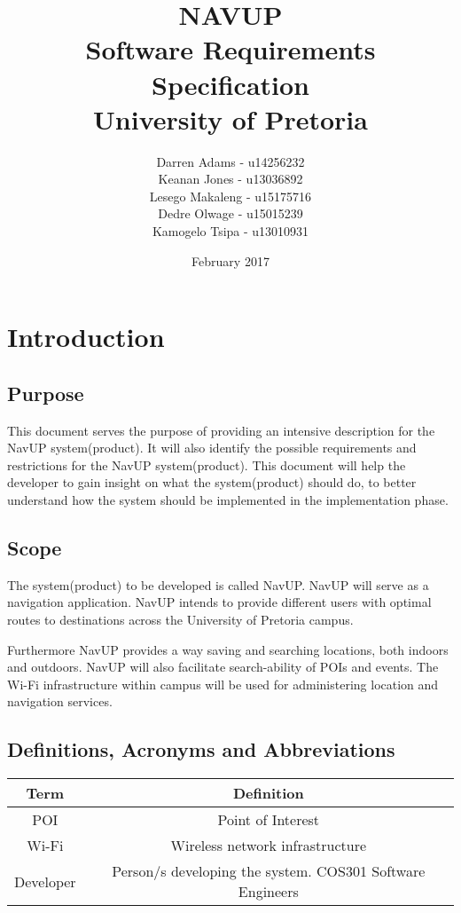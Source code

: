 \documentclass{article}
\title{NAVUP\\ Software Requirements Specification\\ University of Pretoria}
\author{Darren Adams\hspace{2 cm} - u14256232\\ Keanan Jones\hspace{2 cm} - u13036892\\ Lesego Makaleng\hspace{2 cm} - u15175716\\ Dedre Olwage\hspace{2 cm} - u15015239\\ Kamogelo Tsipa\hspace{2 cm} - u13010931 }
\date{February 2017}
\begin{document}
\maketitle
\pagebreak
\tableofcontents
\pagebreak
\section{Introduction}
    \subsection{Purpose}
		\begin{flushleft}
			This document serves the purpose of providing an intensive description for the NavUP system(product). It will also identify the possible requirements and restrictions for the NavUP system(product). This document will help the developer to gain insight on what the system(product) should do, to better understand how the system should be implemented in the implementation phase.
		\end{flushleft}
    \subsection{Scope}
		\begin{flushleft}
			The system(product) to be developed is called NavUP. NavUP will serve as a navigation application. NavUP intends to provide different users with optimal routes to destinations across the University of Pretoria campus.
			
			Furthermore NavUP provides a way saving and searching locations, both indoors and outdoors. NavUP will also facilitate search-ability of POIs and events. The Wi-Fi infrastructure within campus will be used for administering location and navigation services.
		\end{flushleft}
    \subsection{Definitions, Acronyms and Abbreviations}
        \begin{table}[h!]
            \centering
            \begin{tabular}{|c|c|}
            \hline
            Term & Definition \\
            \hline
            POI & Point of Interest \\
            \hline
            Wi-Fi & Wireless network infrastructure \\
            \hline
            Developer & Person/s developing the system. COS301 Software Engineers
            \\
            \hline
            \end{tabular}
        \end{table}
\end{document}
